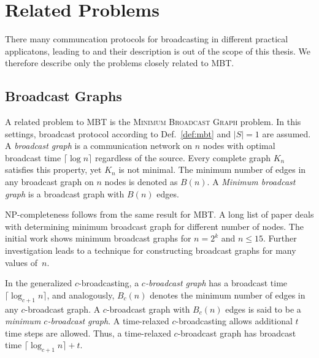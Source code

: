 

\section{Related Problems}

There many communcation protocols for broadcasting in different practical applicatons, leading to  and their description is out of the scope of this thesis.
We therefore describe only the problems closely related to MBT.

\subsection{Broadcast Graphs}\label{sec:bg}

A related problem to MBT is the \textsc{Minimum Broadcast Graph} problem.
In this settings, broadcast protocol according to Def.~\ref{def:mbt} and  $|S|=1$ are assumed.
A \emph{broadcast graph} is a communication network on $n$ nodes with optimal broadcast time $\lceil \log n\rceil$ regardless of the source.
Every complete graph $K_n$ satisfies this property, yet $K_n$ is not minimal. 
The minimum number of edges in any broadcast graph on $n$ nodes is denoted as $B(n)$.
A \emph{Minimum broadcast graph} is a broadcast graph with $B(n)$ edges.

NP-completeness follows from the same result for MBT.
A long list of paper deals with determining minimum broadcast graph for different number of nodes.
The initial work \cite{farley79} shows minimum broadcast graphs for $n=2^k$ and $n\leq 15$.
Further investigation \cite{harutyunyan99} leads to a technique for constructing broadcast graphs for many values of~$n$.

In the generalized $c$-broadcasting, a \emph{$c$-broadcast graph} has a broadcast time $\lceil \log_{c+1} n\rceil$, and analogously, 
$B_c(n)$ denotes the minimum number of edges in any $c$-broadcast graph.
A $c$-broadcast graph with $B_c(n)$ edges is said to be a \emph{minimum $c$-broadcast graph}.
A time-relaxed $c$-broadcasting \cite{mcgarvey16} allows additional $t$ time steps are allowed.
Thus, a time-relaxed $c$-broadcast graph has broadcast time $\lceil \log_{c+1} n\rceil+t$.

